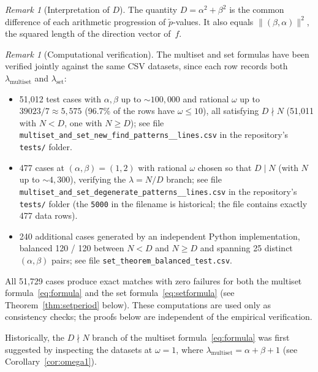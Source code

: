 \documentclass[11pt,reqno]{amsart}
\theoremstyle{plain}
\theoremstyle{definition}
\theoremstyle{remark}
\newtheorem{remark}[theorem]{Remark}
\begin{document}
\begin{remark}[Interpretation of \(D\)]\label{rem:D}
The quantity \(D = \alpha^2+\beta^2\) is the common difference of each
arithmetic progression of \(\tilde{p}\)-values.
It also equals \(\lVert(\beta,\alpha)\rVert^2\), the squared length of the
direction vector of~\(f\).
\end{remark}

\begin{remark}[Computational verification]\label{rem:verification}
The multiset and set formulas have been verified jointly against the same
CSV datasets, since each row records both \(\lambda_{\mathrm{multiset}}\)
and \(\lambda_{\mathrm{set}}\):
\begin{itemize}
    \item 51{,}012 test cases with \(\alpha, \beta\) up to \({\sim}100{,}000\)
          and rational \(\omega\) up to \(39023/7 \approx 5{,}575\)
          (96.7\% of the rows have \(\omega \le 10\)), all satisfying
          \(D \nmid N\) (51{,}011 with \(N < D\), one with \(N \ge D\));
          see file \texttt{multiset\_\allowbreak and\_\allowbreak set\_\allowbreak new\_\allowbreak find\_\allowbreak patterns\_\_\allowbreak lines.csv}
          in the repository's \texttt{tests/} folder.
    \item 477 cases at \((\alpha, \beta) = (1, 2)\) with rational \(\omega\)
          chosen so that \(D \mid N\) (with \(N\) up to \({\sim}4{,}300\)),
          verifying the \(\lambda = N/D\) branch; see file
          \texttt{multiset\_\allowbreak and\_\allowbreak set\_\allowbreak degenerate\_\allowbreak patterns\_\_\allowbreak lines.csv}
          in the repository's \texttt{tests/} folder
          (the \texttt{5000} in the filename is historical; the file
          contains exactly 477 data rows).
    \item 240 additional cases generated by an independent Python
          implementation, balanced 120 / 120 between \(N < D\) and
          \(N \ge D\) and spanning 25 distinct \((\alpha, \beta)\) pairs;
          see file \texttt{set\_\allowbreak theorem\_\allowbreak balanced\_\allowbreak test.csv}.
\end{itemize}
All 51{,}729 cases produce exact matches with zero failures for both the
multiset formula~\eqref{eq:formula} and the set formula~\eqref{eq:setformula}
(see Theorem~\ref{thm:setperiod} below).  These computations are used only
as consistency checks; the proofs below are independent of the empirical
verification.

Historically, the \(D \nmid N\) branch of the multiset
formula~\eqref{eq:formula} was first suggested by inspecting the datasets
at \(\omega = 1\), where
\(\lambda_{\mathrm{multiset}} = \alpha + \beta + 1\)
(see Corollary~\ref{cor:omega1}).

\end{remark}
\end{document}
